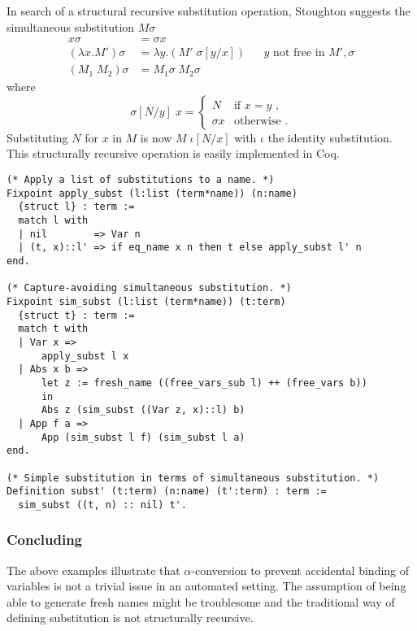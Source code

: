 \documentclass[a4paper,11pt]{article}
\begin{document}
In search of a structural recursive substitution operation, Stoughton
\cite{Stoughton-88} suggests the simultaneous substitution $M \sigma$
\begin{align*}
  x \sigma              &= \sigma x\\
  (\lambda x.M') \sigma &= \lambda y.(M' \; \sigma[y/x])  && \text{$y$ not free in $M', \sigma$}\\
  (M_1 \; M_2) \sigma   &= M_1 \sigma \; M_2 \sigma
\end{align*}
where
\begin{equation*}
  \sigma[N/y] \; x =
  \begin{cases}
    N        & \text{if $x = y$ ,}\\
    \sigma x & \text{otherwise .}
  \end{cases}
\end{equation*}
Substituting $N$ for $x$ in $M$ is now $M \; \iota [N/x]$ with $\iota$
the identity substitution.
This structurally recursive operation is easily implemented in Coq.
\begin{lstlisting}
(* Apply a list of substitutions to a name. *)
Fixpoint apply_subst (l:list (term*name)) (n:name)
  {struct l} : term :=
  match l with
  | nil        => Var n
  | (t, x)::l' => if eq_name x n then t else apply_subst l' n
end.

(* Capture-avoiding simultaneous substitution. *)
Fixpoint sim_subst (l:list (term*name)) (t:term)
  {struct t} : term :=
  match t with
  | Var x =>
      apply_subst l x
  | Abs x b =>
      let z := fresh_name ((free_vars_sub l) ++ (free_vars b))
      in
      Abs z (sim_subst ((Var z, x)::l) b)
  | App f a =>
      App (sim_subst l f) (sim_subst l a)
end.

(* Simple substitution in terms of simultaneous substitution. *)
Definition subst' (t:term) (n:name) (t':term) : term :=
  sim_subst ((t, n) :: nil) t'.
\end{lstlisting}

\subsubsection*{Concluding} %

The above examples illustrate that $\alpha$-conversion to prevent
accidental binding of variables is not a trivial issue in an automated
setting.
The assumption of being able to generate fresh names might be troublesome
and the traditional way of defining substitution is not structurally
recursive.
\end{document}
